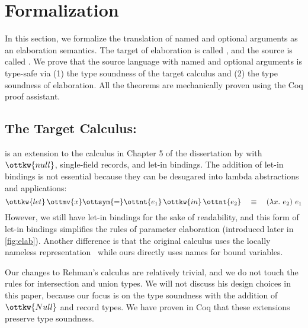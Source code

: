 \section{Formalization}

In this section, we formalize the translation of named and optional arguments as
an elaboration semantics. The target of elaboration is called \lambdaiu, and the
source is called \uaena. We prove that the source language with named and
optional arguments is type-safe via (1) the type soundness of the target
calculus and (2) the type soundness of elaboration. All the theorems are
mechanically proven using the Coq proof assistant.

\subsection{The Target Calculus: \lambdaiu} \label{sec:lambdaiu}

\lambdaiu is an extension to the calculus in Chapter 5 of the dissertation by
\citet{rehman2023blend} with $\ottkw{null}$, single-field records, and let-in
bindings. The addition of let-in bindings is not essential because they can be
desugared into lambda abstractions and applications:
\begin{equation*}
  \ottkw{let} \, \ottmv{x}  \ottsym{=}  \ottnt{e_{{\mathrm{1}}}} \, \ottkw{in} \, \ottnt{e_{{\mathrm{2}}}} \quad \equiv \quad (\lambda x.\ e_2)\ e_1
\end{equation*}
However, we still have let-in bindings for the sake of readability, and this
form of let-in bindings simplifies the rules of parameter elaboration
(introduced later in \autoref{fig:elab}). Another difference is that the
original calculus uses the locally nameless
representation~\citep{chargueraud2012locally} while ours directly uses names for
bound variables.

Our changes to Rehman's calculus are relatively trivial, and we do not touch the
rules for intersection and union types. We will not discuss his design choices
in this paper, because our focus is on the type soundness with the addition of
$\ottkw{Null}$ and record types. We have proven in Coq that these extensions
preserve type soundness.

